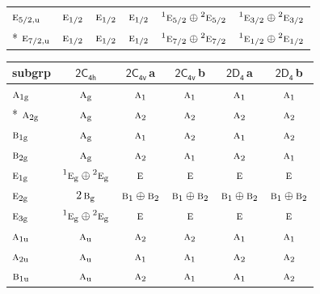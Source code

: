\documentclass[10pt,a4paper]{article}
\numberwithin{equation}{section}
\newcommand{\grp}[1]{\mathsf{#1}}
\newcommand{\irr}[1]{\text{\normalfont\scshape #1}}
\newcommand{\conjpair}[1]{{}^{#1}}
\newcommand{\ptag}[1]{\mathrm{#1}}
\newcommand{\clsletter}[1]{\,{\scriptsize\color{black!55}#1}}
\begin{document}
{\begin{longtable}{@{}lccccc@{}}
$\irr{e}_{5/2,\ptag{u}}$ & $\irr{e}_{1/2}$ & $\irr{e}_{1/2}$ & $\irr{e}_{1/2}$ & $\conjpair{1}\irr{e}_{5/2}\oplus \conjpair{2}\irr{e}_{5/2}$ & $\conjpair{1}\irr{e}_{3/2}\oplus \conjpair{2}\irr{e}_{3/2}$\\*
$\irr{e}_{7/2,\ptag{u}}$ & $\irr{e}_{1/2}$ & $\irr{e}_{1/2}$ & $\irr{e}_{1/2}$ & $\conjpair{1}\irr{e}_{7/2}\oplus \conjpair{2}\irr{e}_{7/2}$ & $\conjpair{1}\irr{e}_{1/2}\oplus \conjpair{2}\irr{e}_{1/2}$\\
\bottomrule\end{longtable}}
{\small\begin{longtable}{@{}lccccc@{}}\toprule
subgrp & \href{2C4h.pdf}{$\grp{2C_{4h}}$} & \href{2C4v.pdf}{$\grp{2C_{4v}}$}\clsletter{a} & \href{2C4v.pdf}{$\grp{2C_{4v}}$}\clsletter{b} & \href{2D4.pdf}{$\grp{2D_{4}}$}\clsletter{a} & \href{2D4.pdf}{$\grp{2D_{4}}$}\clsletter{b}\\\midrule\endhead
\bottomrule\endfoot\endlastfoot
$\irr{a}_{1\ptag{g}}$ & $\irr{a}_{\ptag{g}}$ & $\irr{a}_{1}$ & $\irr{a}_{1}$ & $\irr{a}_{1}$ & $\irr{a}_{1}$\\*
$\irr{a}_{2\ptag{g}}$ & $\irr{a}_{\ptag{g}}$ & $\irr{a}_{2}$ & $\irr{a}_{2}$ & $\irr{a}_{2}$ & $\irr{a}_{2}$\\
$\irr{b}_{1\ptag{g}}$ & $\irr{a}_{\ptag{g}}$ & $\irr{a}_{1}$ & $\irr{a}_{2}$ & $\irr{a}_{1}$ & $\irr{a}_{2}$\\
$\irr{b}_{2\ptag{g}}$ & $\irr{a}_{\ptag{g}}$ & $\irr{a}_{2}$ & $\irr{a}_{1}$ & $\irr{a}_{2}$ & $\irr{a}_{1}$\\
$\irr{e}_{1\ptag{g}}$ & $\conjpair{1}\irr{e}_{\ptag{g}}\oplus \conjpair{2}\irr{e}_{\ptag{g}}$ & $\irr{e}$ & $\irr{e}$ & $\irr{e}$ & $\irr{e}$\\
$\irr{e}_{2\ptag{g}}$ & $2\,\irr{b}_{\ptag{g}}$ & $\irr{b}_{1}\oplus \irr{b}_{2}$ & $\irr{b}_{1}\oplus \irr{b}_{2}$ & $\irr{b}_{1}\oplus \irr{b}_{2}$ & $\irr{b}_{1}\oplus \irr{b}_{2}$\\
$\irr{e}_{3\ptag{g}}$ & $\conjpair{1}\irr{e}_{\ptag{g}}\oplus \conjpair{2}\irr{e}_{\ptag{g}}$ & $\irr{e}$ & $\irr{e}$ & $\irr{e}$ & $\irr{e}$\\
$\irr{a}_{1\ptag{u}}$ & $\irr{a}_{\ptag{u}}$ & $\irr{a}_{2}$ & $\irr{a}_{2}$ & $\irr{a}_{1}$ & $\irr{a}_{1}$\\
$\irr{a}_{2\ptag{u}}$ & $\irr{a}_{\ptag{u}}$ & $\irr{a}_{1}$ & $\irr{a}_{1}$ & $\irr{a}_{2}$ & $\irr{a}_{2}$\\
$\irr{b}_{1\ptag{u}}$ & $\irr{a}_{\ptag{u}}$ & $\irr{a}_{2}$ & $\irr{a}_{1}$ & $\irr{a}_{1}$ & $\irr{a}_{2}$\\

\end{longtable}}
\end{document}

